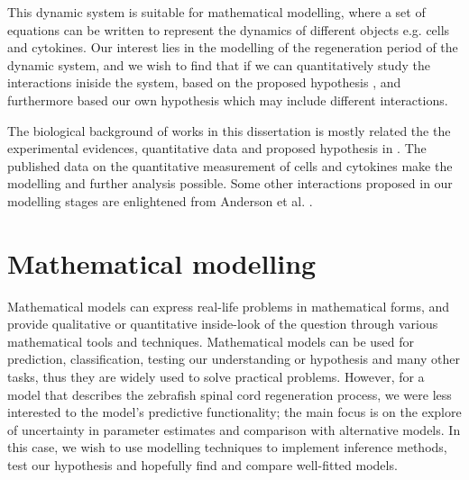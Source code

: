 This dynamic system is suitable for mathematical modelling, where a set of equations can be written to represent the dynamics of different objects e.g. cells and cytokines. Our interest lies in the modelling of the regeneration period of the dynamic system, and we wish to find that if we can quantitatively study the interactions iniside the system, based on the proposed hypothesis \cite{ref:Tsarouchas}, and furthermore based our own hypothesis which may include different interactions.

The biological background of works in this dissertation is mostly related the the experimental evidences, quantitative data and proposed hypothesis in \cite{ref:Tsarouchas}. The published data on the quantitative measurement of cells and cytokines make the modelling and further analysis possible. Some other interactions proposed in our modelling stages are enlightened from Anderson et al. \cite{Anderson}.

\section{Mathematical modelling}



Mathematical models can express real-life problems in mathematical forms, and provide qualitative or quantitative inside-look of the question through various mathematical tools and techniques. Mathematical models can be used for prediction, classification, testing our understanding or hypothesis and many other tasks, thus they are widely used to solve practical problems. However, for a model that describes the zebrafish spinal cord regeneration process, we were less interested to the model's predictive functionality; the main focus is on the explore of uncertainty in parameter estimates and comparison with alternative models. In this case, we wish to use modelling techniques to implement inference methods, test our hypothesis and hopefully find and compare well-fitted models.

